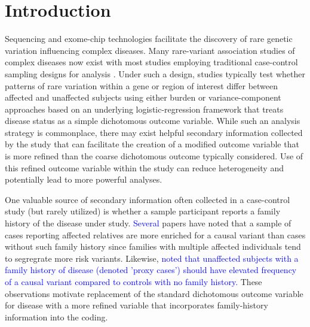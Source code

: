 \documentclass[]{article}
\begin{document}
\pagebreak

\hypertarget{introduction}{%
\section{Introduction}\label{introduction}}

Sequencing and exome-chip technologies facilitate the discovery of rare genetic variation influencing complex diseases. Many rare-variant association studies of complex diseases now exist with most studies employing traditional case-control sampling designs for analysis \citep{DeRubeis2014, Sanders2017}. Under such a design, studies typically test whether patterns of rare variation within a gene or region of interest differ between affected and unaffected subjects using either burden \citep{Li2008, Madsen2009} or variance-component \citep{Wu2011} approaches based on an underlying logistic-regression framework that treats disease status as a simple dichotomous outcome variable. While such an analysis strategy is commonplace, there may exist helpful secondary information collected by the study that can facilitate the creation of a modified outcome variable that is more refined than the coarse dichotomous outcome typically considered. Use of this refined outcome variable within the study can reduce heterogeneity and potentially lead to more powerful analyses.

One valuable source of secondary information often collected in a case-control study (but rarely utilized) is whether a sample participant reports a family history of the disease under study. \textcolor{blue}{Several} papers have noted that a sample of cases reporting affected relatives are more enriched for a causal variant than cases without such family history \citep{TengRisch1999, Zollner2012, Epstein2015} since families with multiple affected individuals tend to segregrate more risk variants.
Likewise, \citet{Liu2017} \textcolor{blue}{noted that unaffected subjects with a family history of disease (denoted 'proxy cases') should have elevated frequency of a causal variant compared to controls with no family history.} These observations motivate replacement of the standard dichotomous outcome variable for disease with a more refined variable that incorporates family-history information into the coding.
\end{document}
